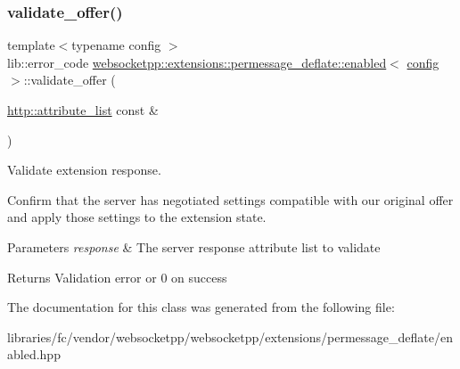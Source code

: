 \subsubsection{\texorpdfstring{validate\+\_\+offer()}{validate\_offer()}}
{\footnotesize\ttfamily template$<$typename config $>$ \\
lib\+::error\+\_\+code \mbox{\hyperlink{classwebsocketpp_1_1extensions_1_1permessage__deflate_1_1enabled}{websocketpp\+::extensions\+::permessage\+\_\+deflate\+::enabled}}$<$ \mbox{\hyperlink{classconfig}{config}} $>$\+::validate\+\_\+offer (\begin{DoxyParamCaption}\item[{\mbox{\hyperlink{namespacewebsocketpp_1_1http_a9744f4104772b987aa9e86c35ce1357b}{http\+::attribute\+\_\+list}} const \&}]{ }\end{DoxyParamCaption})\hspace{0.3cm}{\ttfamily [inline]}}



Validate extension response. 

Confirm that the server has negotiated settings compatible with our original offer and apply those settings to the extension state.


\begin{DoxyParams}{Parameters}
{\em response} & The server response attribute list to validate \\
\hline
\end{DoxyParams}
\begin{DoxyReturn}{Returns}
Validation error or 0 on success 
\end{DoxyReturn}


The documentation for this class was generated from the following file\+:\begin{DoxyCompactItemize}
\item 
libraries/fc/vendor/websocketpp/websocketpp/extensions/permessage\+\_\+deflate/enabled.\+hpp\end{DoxyCompactItemize}
